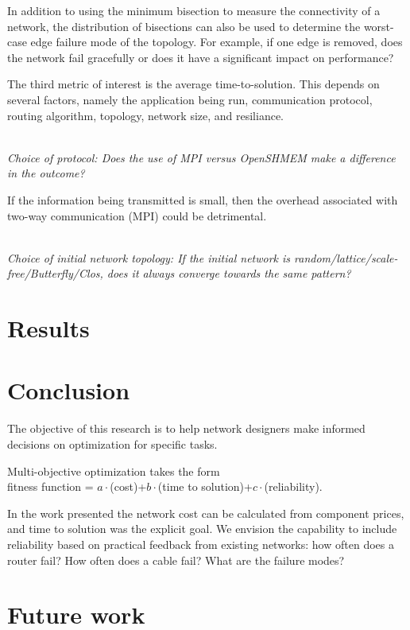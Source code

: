 \documentclass[pdftex]{article}
\begin{document}
In addition to using the minimum bisection to measure the connectivity of a network, the distribution of bisections can also be used to determine the worst-case edge failure mode of the topology. For example, if one edge is removed, does the network fail gracefully or does it have a significant impact on performance?

The third metric of interest is the average time-to-solution. This depends on several factors, namely the application being run, communication protocol, routing algorithm, topology, network size, and resiliance. 

\ \\
\textit{Choice of protocol: Does the use of MPI versus OpenSHMEM make a difference in the outcome?}

If the information being transmitted is small, then the overhead associated with two-way communication (MPI) could be detrimental. 

\ \\
\textit{Choice of initial network topology: If the initial network is random/lattice/scale-free/Butterfly/Clos, does it always converge towards the same pattern?}


\section{Results}

\section{Conclusion}

The objective of this research is to help network designers make informed decisions on optimization for specific tasks. 

Multi-objective optimization takes the form\\
fitness function = $a\cdot$(cost)+$b\cdot$(time to solution)+$c\cdot$(reliability).

In the work presented the network cost can be calculated from component prices, and time to solution was the explicit goal. We envision the capability to include reliability based on practical feedback from existing networks: how often does a router fail? How often does a cable fail? What are the failure modes?

\section{Future work}
\end{document}
